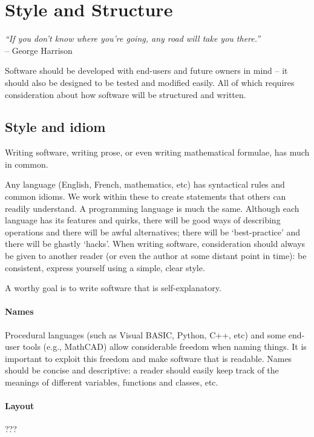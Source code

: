 \section{Style and Structure}
\begin{flushright}
\textit{“If you don’t know where you’re going, any road will take you there.”} \\
-- George Harrison 
\end{flushright}


Software should be developed with end-users and future owners in mind – it should also be designed to be tested and modified easily. All of which requires consideration about how software will be structured and written.

\subsection{Style and idiom}
Writing software, writing prose, or even writing mathematical formulae, has much in common.

Any language (English, French, mathematics, etc) has syntactical rules and common idioms. We work within these to create statements that others can readily understand. A programming language is much the same. Although each language has its features and quirks, there will be good ways of describing operations and there will be awful alternatives; there will be ‘best-practice’ and there will be ghastly ‘hacks’. When writing software, consideration should always be given to another reader (or even the author at some distant point in time): be consistent, express yourself using a simple, clear style.

A worthy goal is to write software that is self-explanatory. 

\paragraph{Names}
Procedural languages (such as Visual BASIC, Python, C++, etc) and some end-user tools (e.g., MathCAD) allow considerable freedom when naming things. It is important to exploit this freedom and make software that is readable. Names should be concise and descriptive: a reader should easily keep track of the meanings of different variables, functions and classes, etc.

\paragraph{Layout} ???

